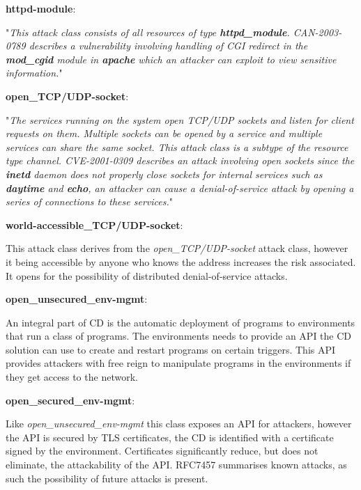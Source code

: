 
\textbf{httpd-module}: \begin{displayquote}
"\textit{This attack class consists of all resources of type \textbf{httpd\_module}. CAN-2003-0789 describes a vulnerability  involving  handling  of  CGI  redirect  in  the \textbf{mod\_cgid} module in \textbf{apache} which an attacker can exploit to view sensitive information.}"\footnotemark[2]
\end{displayquote}

\textbf{open\_TCP/UDP-socket}: \begin{displayquote}
"\textit{The services  running  on  the system open TCP/UDP sockets and listen for client requests on them. Multiple sockets can be opened by a service and multiple services can share the same socket. This attack class is a subtype of the resource type channel. CVE-2001-0309 describes an attack involving open sockets since the \textbf{inetd} daemon does not properly close sockets for internal services such as \textbf{daytime} and \textbf{echo}, an attacker can cause a denial-of-service attack by opening a series of connections to these services.}"\footnotemark[2]
\end{displayquote}


\textbf{world-accessible\_TCP/UDP-socket}: \begin{displayquote}
This attack class derives from the \textit{open\_TCP/UDP-socket} attack class, however it being accessible by anyone who knows the address increases the risk associated. It opens for the possibility of distributed denial-of-service attacks\cite{ddos}.
\end{displayquote}

\textbf{open\_unsecured\_env-mgmt}: \begin{displayquote}
An integral part of CD is the automatic deployment of programs to environments that run a class of programs. The environments needs to provide an API the CD solution can use to create and restart programs on certain triggers. This API provides attackers with free reign to manipulate programs in the environments if they get access to the network. 
\end{displayquote}

\textbf{open\_secured\_env-mgmt}: \begin{displayquote}
Like \textit{open\_unsecured\_env-mgmt} this class exposes an API for attackers, however the API is secured by TLS certificates, the CD is identified with a certificate signed by the environment. Certificates significantly reduce, but does not eliminate, the attackability of the API. RFC7457\cite{rfc7457} summarises known attacks, as such the possibility of future attacks is present.
\end{displayquote}


